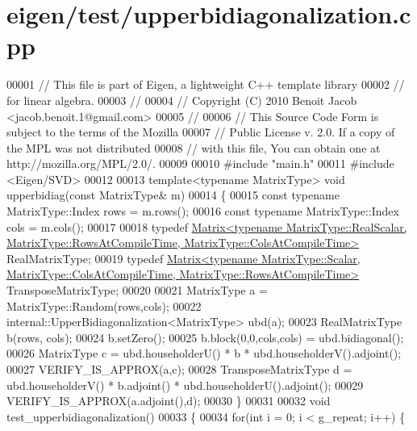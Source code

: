 \hypertarget{eigen_2test_2upperbidiagonalization_8cpp_source}{}\section{eigen/test/upperbidiagonalization.cpp}
\label{eigen_2test_2upperbidiagonalization_8cpp_source}

\begin{DoxyCode}
00001 \textcolor{comment}{// This file is part of Eigen, a lightweight C++ template library}
00002 \textcolor{comment}{// for linear algebra.}
00003 \textcolor{comment}{//}
00004 \textcolor{comment}{// Copyright (C) 2010 Benoit Jacob <jacob.benoit.1@gmail.com>}
00005 \textcolor{comment}{//}
00006 \textcolor{comment}{// This Source Code Form is subject to the terms of the Mozilla}
00007 \textcolor{comment}{// Public License v. 2.0. If a copy of the MPL was not distributed}
00008 \textcolor{comment}{// with this file, You can obtain one at http://mozilla.org/MPL/2.0/.}
00009 
00010 \textcolor{preprocessor}{#include "main.h"}
00011 \textcolor{preprocessor}{#include <Eigen/SVD>}
00012 
00013 \textcolor{keyword}{template}<\textcolor{keyword}{typename} MatrixType> \textcolor{keywordtype}{void} upperbidiag(\textcolor{keyword}{const} MatrixType& m)
00014 \{
00015   \textcolor{keyword}{const} \textcolor{keyword}{typename} MatrixType::Index rows = m.rows();
00016   \textcolor{keyword}{const} \textcolor{keyword}{typename} MatrixType::Index cols = m.cols();
00017 
00018   \textcolor{keyword}{typedef} 
      \hyperlink{group___core___module_class_eigen_1_1_matrix}{Matrix<typename MatrixType::RealScalar, MatrixType::RowsAtCompileTime,  MatrixType::ColsAtCompileTime>}
       RealMatrixType;
00019   \textcolor{keyword}{typedef} 
      \hyperlink{group___core___module_class_eigen_1_1_matrix}{Matrix<typename MatrixType::Scalar, MatrixType::ColsAtCompileTime,  MatrixType::RowsAtCompileTime>}
       TransposeMatrixType;
00020 
00021   MatrixType a = MatrixType::Random(rows,cols);
00022   internal::UpperBidiagonalization<MatrixType> ubd(a);
00023   RealMatrixType b(rows, cols);
00024   b.setZero();
00025   b.block(0,0,cols,cols) = ubd.bidiagonal();
00026   MatrixType c = ubd.householderU() * b * ubd.householderV().adjoint();
00027   VERIFY\_IS\_APPROX(a,c);
00028   TransposeMatrixType d = ubd.householderV() * b.adjoint() * ubd.householderU().adjoint();
00029   VERIFY\_IS\_APPROX(a.adjoint(),d);
00030 \}
00031 
00032 \textcolor{keywordtype}{void} test\_upperbidiagonalization()
00033 \{
00034   \textcolor{keywordflow}{for}(\textcolor{keywordtype}{int} i = 0; i < g\_repeat; i++) \{

\end{DoxyCode}
